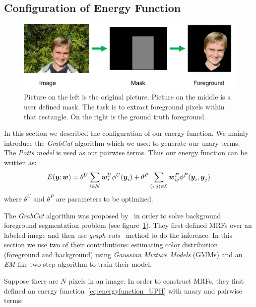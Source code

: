\subsection{Configuration of Energy Function}
\label{sec:grabcut}

\begin{figure}[t]
  \centering
  \includegraphics[width=1\linewidth]{RelatedWorks/figures/grabcut_task.png}
  \caption{\label{fig:grabcut_example} Picture on the left is
    the original picture. Picture
    on the middle is a user defined mask. The task is to extract
    foreground pixels within that rectangle. On the right is the
    ground truth foreground.}
\end{figure}

In this section we described the configuration of our energy
function. We mainly introduce the \emph{GrabCut} algorithm which
we used to generate our unary terms. The \emph{Potts model} is
used as our pairwise terms. Thus our energy function can be
written as:
\begin{align}
  \label{eq:energyfunction_UP}
  E({\boldsymbol{y}};{\boldsymbol{w}})=\theta^U\sum_{i\in {\cal N}}{{\boldsymbol{w}}_i^U\phi^U({\boldsymbol{y}}_i)}+
  \theta^P\sum_{(i,j)\in {\cal E}}{{\boldsymbol{w}}_{ij}^P\phi^P({\boldsymbol{y}}_i,{\boldsymbol{y}}_j)}
\end{align}
\noindent where $\theta^U$ and $\theta^P$ are parameters to be
optimized.

The \emph{GrabCut} algorithm was proposed
by~ in order to solve background
foreground segmentation problem (see
figure~\ref{fig:grabcut_example}). They first defined MRFs over
an labeled image and then use
\emph{graph-cuts}~\cite{Boykov:ICCV01} method to do the
inference. In this section we use two of their contributions:
estimating color distribution (foreground and background) using
\emph{Gaussian Mixture Models} (GMMs) and an \emph{EM} like
two-step algorithm to train their model.

Suppose there are $N$ pixels in an image. In order to construct
MRFs, they first defined an energy
function~\eqref{eq:energyfunction_UPH} with unary and pairwise
terms:


